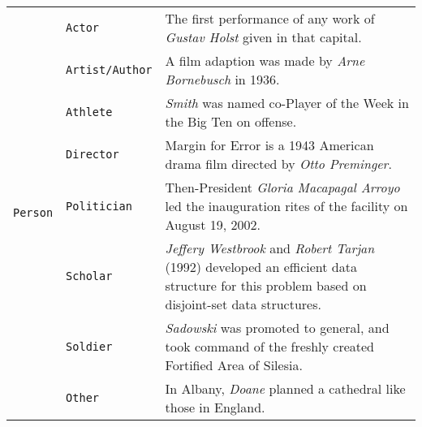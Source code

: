 \documentclass[11pt,a4paper, dvipsnames]{article}
\begin{document}
\begin{longtable}{clp{9.5cm}}
\multirow{8}{*}{\texttt{\color{PineGreen}Person}}                       & \texttt{\color{PineGreen}Actor}               & The first performance of any work of \textit{\color{PineGreen}Gustav Holst} given in that capital.                                                                       \\ \cmidrule(r){2-2} \cmidrule(r){3-3}
                                              & \texttt{\color{PineGreen}Artist/Author}      & A film adaption was made by \textit{\color{PineGreen}Arne Bornebusch} in 1936.                                                                                           \\ \cmidrule(r){2-2} \cmidrule(r){3-3}
                                              & \texttt{\color{PineGreen}Athlete}             & \textit{\color{PineGreen}Smith} was named co-Player of the Week in the Big Ten on offense.                                                                               \\ \cmidrule(r){2-2} \cmidrule(r){3-3}
                                              & \texttt{\color{PineGreen}Director}            & Margin for Error is a 1943 American drama film directed by \textit{\color{PineGreen}Otto Preminger}.                                                                     \\ \cmidrule(r){2-2} \cmidrule(r){3-3}
                                              & \texttt{\color{PineGreen}Politician}          & Then-President \textit{\color{PineGreen}Gloria Macapagal Arroyo} led the inauguration rites of the facility on August 19, 2002.                                          \\ \cmidrule(r){2-2} \cmidrule(r){3-3}
                                              & \texttt{\color{PineGreen}Scholar}             & \textit{\color{PineGreen}Jeffery Westbrook} and \textit{\color{PineGreen}Robert Tarjan} (1992) developed an efficient data structure for this problem based on disjoint-set data structures. \\ \cmidrule(r){2-2} \cmidrule(r){3-3}
                                              & \texttt{\color{PineGreen}Soldier}             & \textit{\color{PineGreen}Sadowski} was promoted to general, and took command of the freshly created Fortified Area of Silesia.                                           \\ \cmidrule(r){2-2} \cmidrule(r){3-3}
                                              & \texttt{\color{PineGreen}Other}               & In Albany, \textit{\color{PineGreen}Doane} planned a cathedral like those in England.                                                                                    \\ \midrule

\end{longtable}
\end{document}
